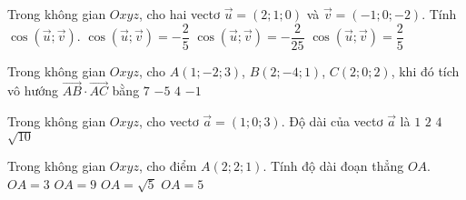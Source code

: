 \begin{ex}%
	Trong không gian $Oxyz$, cho hai vectơ $\overrightarrow{u}=(2;1;0)$ và $\overrightarrow{v}=(-1;0;-2)$. Tính $\cos\left(\overrightarrow{u};\overrightarrow{v}\right)$.
	{\True $\cos\left(\overrightarrow{u};\overrightarrow{v}\right)=-\dfrac{2}{5}$}
	{$\cos\left(\overrightarrow{u};\overrightarrow{v}\right)=-\dfrac{2}{25}$}
	{$\cos\left(\overrightarrow{u};\overrightarrow{v}\right)=\dfrac{2}{5}$}
\end{ex}

\begin{ex}%
	Trong không gian $Oxyz$, cho $A(1;-2;3)$, $B(2;-4;1)$, $C(2;0;2)$, khi đó tích vô hướng $\overrightarrow{AB}\cdot\overrightarrow{AC}$ bằng
	\choice
	{$7$}
	{$-5$}
	{$4$}
	{\True $-1$}
\end{ex}


\begin{ex}%
	Trong không gian $Oxyz$, cho vectơ $\overrightarrow{a}=(1;0;3)$. Độ dài của vectơ $\overrightarrow{a}$ là
	\choice
	{$1$}
	{$2$}
	{$4$}
	{\True $\sqrt{10}$}
\end{ex}

\begin{ex}%
	Trong không gian $O x y z$, cho điểm $A(2 ; 2 ; 1)$. Tính độ dài đoạn thẳng $O A$.
	\choice
	{\True $O A=3$}
	{$O A=9$}
	{$O A=\sqrt{5}$}
	{$O A=5$}
\end{ex}

